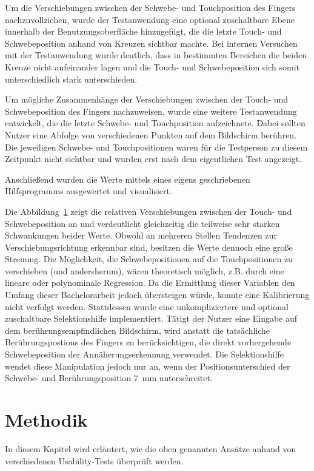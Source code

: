 \documentclass[12pt,numbers=noenddot,parskip,bibliography=totocnumbered,listof=totocnumbered]{scrreprt}
\begin{document}
Um die Verschiebungen zwischen der Schwebe- und Touchposition des Fingers nachzuvollziehen, wurde der Testanwendung eine optional zuschaltbare Ebene innerhalb der Benutzungsoberfläche hinzugefügt, die die letzte Touch- und Schwebeposition anhand von Kreuzen sichtbar machte. Bei internen Versuchen mit der Testanwendung wurde deutlich, dass in bestimmten Bereichen die beiden Kreuze nicht aufeinander lagen und die Touch- und Schwebeposition sich somit unterschiedlich stark unterschieden.

Um mögliche Zusammenhänge der Verschiebungen zwischen der Touch- und Schwebeposition des Fingers nachzuweisen, wurde eine weitere Testanwendung entwickelt, die die letzte Schwebe- und Touchposition aufzeichnete. Dabei sollten Nutzer eine Abfolge von verschiedenen Punkten auf dem Bildschirm berühren. Die jeweiligen Schwebe- und Touchpositionen waren für die Testperson zu diesem Zeitpunkt nicht sichtbar und wurden erst nach dem eigentlichen Test angezeigt.
\begin{figure}
\centering

\label{klickschwebepositionen}
\end{figure}
Anschließend wurden die Werte mittels eines eigens geschriebenen Hilfsprogramms ausgewertet und visualisiert.

Die Abbildung~\ref{klickschwebepositionen} zeigt die relativen Verschiebungen zwischen der Touch- und Schwebeposition an und verdeutlicht gleichzeitig die teilweise sehr starken Schwankungen beider Werte. Obwohl an mehreren Stellen Tendenzen zur Verschiebungsrichtung erkennbar sind, besitzen die Werte dennoch eine große Streuung. Die Möglichkeit, die Schwebepositionen auf die Touchpositionen zu verschieben (und andersherum), wären theoretisch möglich, z.B. durch eine lineare oder polynominale Regression. Da die Ermittlung dieser Variablen den Umfang dieser Bachelorarbeit jedoch übersteigen würde, konnte eine Kalibrierung nicht verfolgt werden. Stattdessen wurde eine unkompliziertere und optional zuschaltbare Selektionshilfe implementiert. Tätigt der Nutzer eine Eingabe auf dem berührungsempfindlichen Bildschirm, wird anstatt die tatsächliche Berührungspostions des Fingers zu berücksichtigen, die direkt vorhergehende Schwebeposition der Annäherungserkennung verwendet. Die Selektionshilfe wendet diese Manipulation jedoch nur an, wenn der Positionsunterschied der Schwebe- und Berührungsposition \mbox{$7$ mm} unterschreitet.

\chapter{Methodik}
In diesem Kapitel wird erläutert, wie die oben genannten Ansätze anhand von verschiedenen Usability-Tests überprüft werden.
\end{document}
